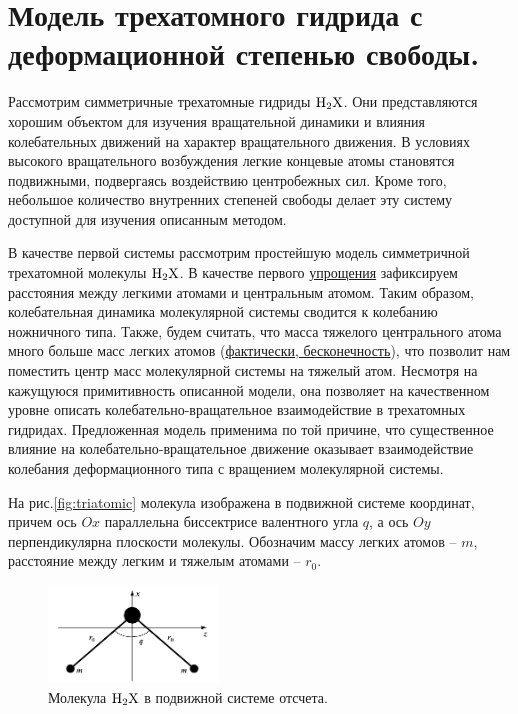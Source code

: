 \section{Модель трехатомного гидрида с деформационной степенью свободы.}

Рассмотрим симметричные трехатомные гидриды $\ce{H2X}$. Они представляются хорошим объектом для изучения вращательной динамики и влияния колебательных движений на характер вращательного движения. В условиях высокого вращательного возбуждения легкие концевые атомы становятся подвижными, подвергаясь воздействию центробежных сил. Кроме того, небольшое количество внутренних степеней свободы делает эту систему доступной для изучения описанным методом. 

В качестве первой системы рассмотрим простейшую модель симметричной трехатомной молекулы $\ce{H2X}$. В качестве первого \underline{упрощения} зафиксируем расстояния между легкими атомами и центральным атомом. Таким образом, колебательная динамика молекулярной системы сводится к колебанию ножничного типа. Также, будем считать, что масса тяжелого центрального атома много больше масс легких атомов (\underline{фактически, бесконечность}), что позволит нам поместить центр масс молекулярной системы на тяжелый атом. Несмотря на кажущуюся примитивность описанной модели, она позволяет на качественном уровне описать колебательно-вращательное взаимодействие в трехатомных гидридах. Предложенная модель применима по той причине, что существенное влияние на колебательно-вращательное движение оказывает взаимодействие колебания деформационного типа с вращением молекулярной системы.

На рис.\eqref{fig:triatomic} молекула изображена в подвижной системе координат, причем ось $Ox$ параллельна биссектрисе валентного угла $q$, а ось $Oy$ перпендикулярна плоскости молекулы. Обозначим массу легких атомов -- $m$, расстояние между легким и тяжелым атомами -- $r_0$. 

\begin{figure}[!ht]
  \centering
	\includegraphics[width=0.4\textwidth]{../pictures/triatomic_fixed.png}
	\caption{Молекула $\ce{H2X}$ в подвижной системе отсчета.}
	\label{fig:triatomic}
\end{figure}

